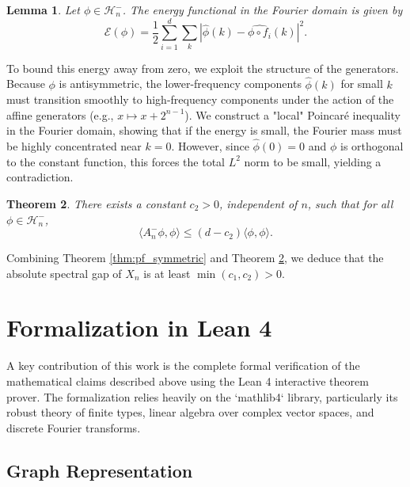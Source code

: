 \documentclass[11pt, a4paper]{article}
\newtheorem{theorem}{Theorem}[section]
\newtheorem{lemma}[theorem]{Lemma}
\theoremstyle{definition}
\begin{document}
\begin{lemma}
Let $\phi \in \mathcal{H}_n^-$. The energy functional in the Fourier domain is given by
\begin{equation}
    \mathcal{E}(\phi) = \frac{1}{2} \sum_{i=1}^d \sum_k |\widehat{\phi}(k) - \widehat{\phi \circ f_i}(k)|^2.
\end{equation}
\end{lemma}

To bound this energy away from zero, we exploit the structure of the generators. Because $\phi$ is antisymmetric, the lower-frequency components $\widehat{\phi}(k)$ for small $k$ must transition smoothly to high-frequency components under the action of the affine generators (e.g., $x \mapsto x + 2^{n-1}$). We construct a "local" Poincaré inequality in the Fourier domain, showing that if the energy is small, the Fourier mass must be highly concentrated near $k=0$. However, since $\widehat{\phi}(0) = 0$ and $\phi$ is orthogonal to the constant function, this forces the total $L^2$ norm to be small, yielding a contradiction.

\begin{theorem} \label{thm:fourier_bound}
There exists a constant $c_2 > 0$, independent of $n$, such that for all $\phi \in \mathcal{H}_n^-$,
\begin{equation}
    \langle A_n^- \phi, \phi \rangle \le (d - c_2) \langle \phi, \phi \rangle.
\end{equation}
\end{theorem}

Combining Theorem \ref{thm:pf_symmetric} and Theorem \ref{thm:fourier_bound}, we deduce that the absolute spectral gap of $X_n$ is at least $\min(c_1, c_2) > 0$.

\section{Formalization in Lean 4}

A key contribution of this work is the complete formal verification of the mathematical claims described above using the Lean 4 interactive theorem prover. The formalization relies heavily on the `mathlib4` library, particularly its robust theory of finite types, linear algebra over complex vector spaces, and discrete Fourier transforms.

\subsection{Graph Representation}
\end{document}
